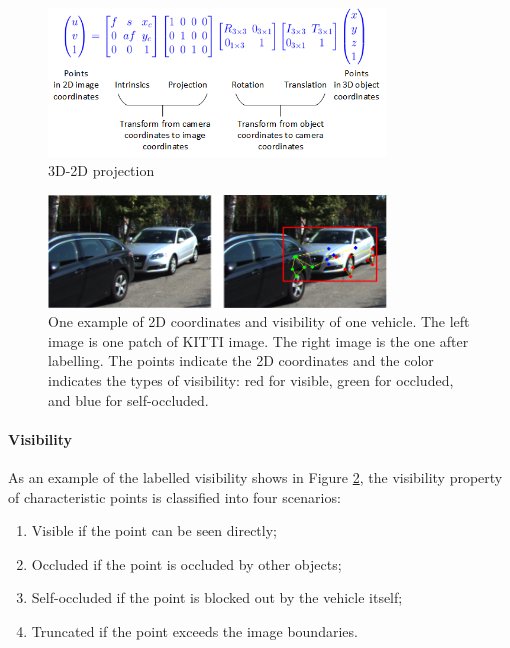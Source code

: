 \documentclass[a4paper,12pt]{article}
\begin{document}
\begin{figure}[H]		
	\includegraphics[width=0.8\textwidth]{projection_matrix.png}
	\caption{3D-2D projection}
	\centering
	\label{3D_2D_projection}
\end{figure}

\begin{figure}[H]		
	\includegraphics[width=0.8\textwidth]{visibilie_eg.png}
	\caption[One example of 2D coordinates and visibility]{One example of 2D coordinates and visibility of one vehicle. The left image is one patch of KITTI image. The right image is the one after labelling. The points indicate the 2D coordinates and the color indicates the types of visibility: red for visible, green for occluded, and blue for self-occluded.}
	\centering
	\label{visibilie_eg}
\end{figure}




\paragraph{Visibility}
\label{visibility}

As an example of the labelled visibility shows in Figure \ref{visibilie_eg}, the visibility property of characteristic points is classified into four scenarios: 

\begin{enumerate}[\hspace{0.4cm} i.]
	\itemsep-0.5em 
	\item Visible if the point can be seen directly;
	\item Occluded if the point is occluded by other objects;
	\item Self-occluded if the point is blocked out by the vehicle itself;
	\item Truncated if the point exceeds the image boundaries. 
\end{enumerate}
\end{document}
